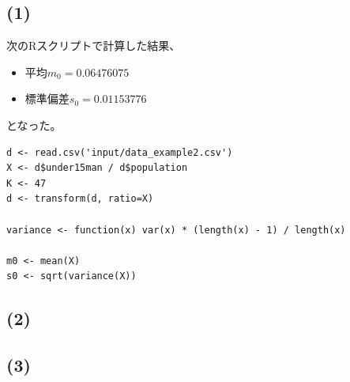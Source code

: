 \documentclass[a4j,xelatex,ja=standard,jafont=hiragino-pron, 9pt]{bxjsarticle}
\begin{document}
\subsection*{(1)}

次のRスクリプトで計算した結果、

\begin{itemize}
  \item
    平均$m_0 = 0.06476075$
  \item
    標準偏差$s_0 = 0.01153776$
\end{itemize}

となった。

\begin{lstlisting}
d <- read.csv('input/data_example2.csv')
X <- d$under15man / d$population
K <- 47
d <- transform(d, ratio=X)

variance <- function(x) var(x) * (length(x) - 1) / length(x)

m0 <- mean(X)
s0 <- sqrt(variance(X))
\end{lstlisting}

\subsection*{(2)}

\subsection*{(3)}
\end{document}
